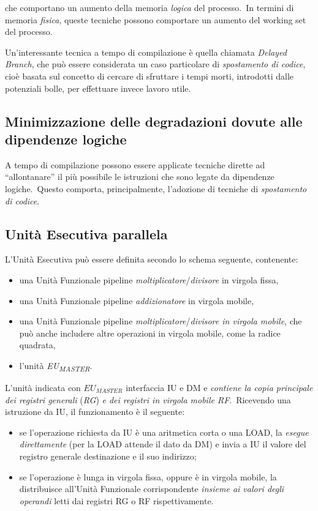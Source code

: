 \noindent che comportano un aumento della memoria \textit{logica} del processo.\
In termini di memoria \textit{fisica}, queste tecniche possono comportare un aumento del working set del processo.

Un'interessante tecnica a tempo di compilazione è quella chiamata \textit{Delayed Branch}, che può essere considerata un caso particolare di \textit{spostamento di codice}, cioè basata sul concetto di cercare di sfruttare i tempi morti, introdotti dalle potenziali bolle, per effettuare invece lavoro utile.

\subsection{Minimizzazione delle degradazioni dovute alle dipendenze logiche}

A tempo di compilazione possono essere applicate tecniche dirette ad ``allontanare'' il più possibile le istruzioni che sono legate da dipendenze logiche.\
Questo comporta, principalmente, l'adozione di tecniche di \textit{spostamento di codice}.

\subsection{Unità Esecutiva parallela}

L'Unità Esecutiva può essere definita secondo lo schema seguente, contenente:

\begin{itemize}
    \item una Unità Funzionale pipeline \textit{moltiplicatore}/\textit{divisore} in virgola fissa,
    \item una Unità Funzionale pipeline \textit{addizionatore} in virgola mobile,
    \item una Unità Funzionale pipeline \textit{moltiplicatore}/\textit{divisore in virgola mobile}, che può anche includere altre operazioni in virgola mobile, come la radice quadrata,
    \item l'unità \textit{EU\textsubscript{MASTER}}.
\end{itemize}

\noindent L'unità indicata con $\mathit{EU_{MASTER}}$ interfaccia IU e DM e \textit{contiene la copia principale dei registri generali} (\textit{RG}) \textit{e dei registri in virgola mobile RF}.\
Ricevendo una istruzione da IU, il funzionamento è il seguente:

\begin{itemize}
    \item se l'operazione richiesta da IU è una aritmetica corta o una {\ttfamily LOAD}, la \textit{esegue direttamente} (per la {\ttfamily LOAD} attende il dato da DM) e invia a IU il valore del registro generale destinazione e il suo indirizzo;
    \item se l'operazione è lunga in virgola fissa, oppure è in virgola mobile, la distribuisce all'Unità Funzionale corrispondente \textit{insieme ai valori degli operandi} letti dai registri RG o RF rispettivamente.
\end{itemize}

